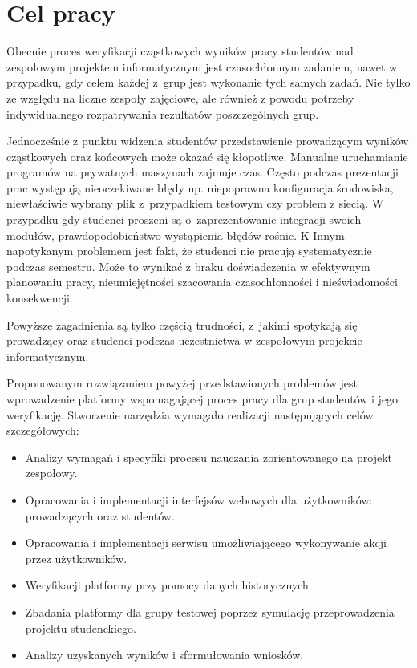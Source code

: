 \chapter{Cel pracy}

Obecnie proces weryfikacji cząstkowych wyników pracy studentów nad zespołowym projektem informatycznym jest czasochłonnym zadaniem, nawet w przypadku, gdy celem każdej z~grup jest wykonanie tych samych zadań.
Nie tylko ze względu na liczne zespoły zajęciowe, ale również z powodu potrzeby indywidualnego rozpatrywania rezultatów poszczególnych grup.

Jednocześnie z punktu widzenia studentów przedstawienie prowadzącym wyników cząstkowych oraz końcowych może okazać się kłopotliwe.
Manualne uruchamianie programów na prywatnych maszynach zajmuje czas.
Często podczas prezentacji prac występują nieoczekiwane błędy np. niepoprawna konfiguracja środowiska, niewłaściwie wybrany plik z~przypadkiem testowym czy problem z siecią.
W przypadku gdy studenci proszeni są o~zaprezentowanie integracji swoich modułów, prawdopodobieństwo wystąpienia błędów rośnie.
K
Innym napotykanym problemem jest fakt, że studenci nie pracują systematycznie podczas semestru.
Może to wynikać z braku doświadczenia w efektywnym planowaniu pracy, nieumiejętności szacowania czasochłonności i nieświadomości konsekwencji.

Powyższe zagadnienia są tylko częścią trudności, z~jakimi spotykają się prowadzący oraz studenci podczas uczestnictwa w zespołowym projekcie informatycznym.

Proponowanym rozwiązaniem powyżej przedstawionych problemów jest wprowadzenie platformy wspomagającej proces pracy dla grup studentów i jego weryfikację.
Stworzenie narzędzia wymagało realizacji następujących celów szczegółowych:
\begin{itemize}
    \item Analizy wymagań i specyfiki procesu nauczania zorientowanego na projekt zespołowy.
    \item Opracowania i implementacji interfejsów webowych dla użytkowników: prowadzących oraz studentów.
    \item Opracowania i implementacji serwisu umożliwiającego wykonywanie akcji przez użytkowników.
    \item Weryfikacji platformy przy pomocy danych historycznych.
    \item Zbadania platformy dla grupy testowej poprzez symulację przeprowadzenia projektu studenckiego.
    \item Analizy uzyskanych wyników i sformułowania wniosków.
\end{itemize}


